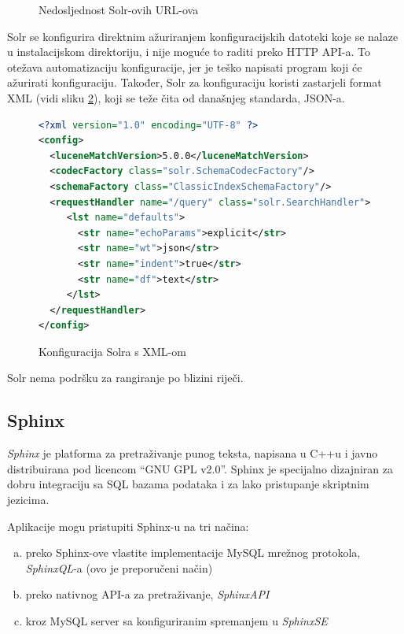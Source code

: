 \documentclass[a4paper,twoside,12pt]{scrreprt}
\begin{document}
\begin{figure}[H]
  \centering
  \caption{Nedosljednost Solr-ovih URL-ova}
  \label{solr-urls}
\end{figure}

Solr se konfigurira direktnim ažuriranjem konfiguracijskih datoteki koje se nalaze u instalacijskom direktoriju, i nije moguće to raditi preko HTTP API-a. To otežava automatizaciju konfiguracije, jer je teško napisati program koji će ažurirati konfiguraciju. Također, Solr za konfiguraciju koristi zastarjeli format XML (vidi sliku \ref{solr-xml}), koji se teže čita od današnjeg standarda, JSON-a.

\begin{figure}[H]
  \centering
  \begin{lstlisting}[language=XML, frame=single]
<?xml version="1.0" encoding="UTF-8" ?>
<config>
  <luceneMatchVersion>5.0.0</luceneMatchVersion>
  <codecFactory class="solr.SchemaCodecFactory"/>
  <schemaFactory class="ClassicIndexSchemaFactory"/>
  <requestHandler name="/query" class="solr.SearchHandler">
     <lst name="defaults">
       <str name="echoParams">explicit</str>
       <str name="wt">json</str>
       <str name="indent">true</str>
       <str name="df">text</str>
     </lst>
  </requestHandler>
</config>
  \end{lstlisting}
  \caption{Konfiguracija Solra s XML-om}
  \label{solr-xml}
\end{figure}

Solr nema podršku za rangiranje po blizini riječi.

\subsection{Sphinx}

\textit{Sphinx} je platforma za pretraživanje punog teksta, napisana u C++u i javno distribuirana pod licencom ``GNU GPL v2.0''. Sphinx je specijalno dizajniran za dobru integraciju sa SQL bazama podataka i za lako pristupanje skriptnim jezicima.

Aplikacije mogu pristupiti Sphinx-u na tri načina:

\begin{enumerate}[(a)]
  \item preko Sphinx-ove vlastite implementacije MySQL mrežnog protokola, \textit{SphinxQL}-a (ovo je preporučeni način)
  \item preko nativnog API-a za pretraživanje, \textit{SphinxAPI}
  \item kroz MySQL server sa konfiguriranim spremanjem u \textit{SphinxSE}
\end{enumerate}
\end{document}
